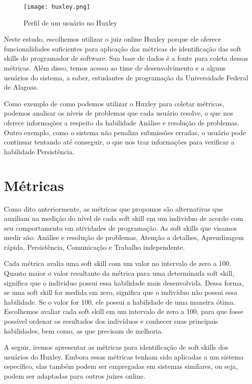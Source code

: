\begin{figure}[ht]
\centering
\caption{\small Perfil de um usuário no Huxley} 
\texttt{[image: huxley.png]}
\label{fig:huxley}
\end{figure}

Neste estudo, escolhemos utilizar o juiz online Huxley porque ele oferece funcionalidades suficientes para aplicação das métricas de identificação das soft skills do programador de software. Sua base de dados é a fonte para coleta dessas métricas. Além disso, temos acesso ao time de desenvolvimento e a alguns usuários do sistema, a saber, estudantes de programação da Universidade Federal de Alagoas.

Como exemplo de como podemos utilizar o Huxley para coletar métricas, podemos analisar os níveis de problemas que cada usuário resolve, o que nos oferece informações a respeito da habilidade Análise e resolução de problemas. Outro exemplo, como o sistema não penaliza submissões erradas, o usuário pode continuar tentando até conseguir, o que nos traz informações para verificar a habilidade Persistência.

\section{Métricas} 
\label{sec:metrics}

Como dito anteriormente, as métricas que propomos são alternativas que auxiliam na medição do nível de cada soft skill em um individuo de acordo com seu comportamento em atividades de programação. As soft skills que visamos medir são: Análise e resolução de problemas, Atenção a detalhes, Aprendizagem rápida, Persistência, Comunicação e Trabalho independente.

Cada métrica avalia uma soft skill com um valor no intervalo de zero a 100. Quanto maior o valor resultante da métrica para uma determinada soft skill, significa que o individuo possui essa habilidade mais desenvolvida. Dessa forma, se uma soft skill for medida em zero, significa que o indivíduo não possui essa habilidade. Se o valor for 100, ele possui a habilidade de uma maneira ótima. Escolhemos avaliar cada soft skill em um intervalo de zero a 100, para que fosse possível ordenar os resultados dos indivíduos e conhecer suas principais habilidades, bem como, as que precisam de melhoria.

A seguir, iremos apresentar as métricas para identificação de soft skills dos usuários do Huxley. Embora essas métricas tenham sido aplicadas a um sistema específico, elas também  podem ser empregadas em sistemas similares, ou seja, podem ser adaptadas para outros juízes online.

